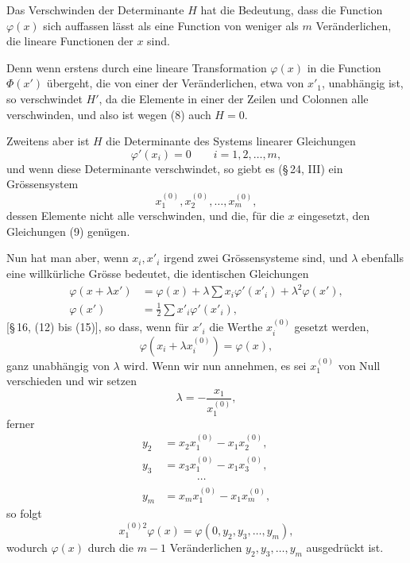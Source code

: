 \documentclass[11pt]{article}
\begin{document}
Das Verschwinden der Determinante $H$ hat die Bedeutung, dass die Function $\varphi(x)$ sich auffassen lässt als eine Function von weniger als $m$ Veränderlichen, die lineare Functionen der $x$ sind.

Denn wenn erstens durch eine lineare Transformation $\varphi(x)$ in die Function $\Phi(x')$ übergeht, die von einer der Veränderlichen, etwa von $x'_1$, unabhängig ist, so verschwindet $H'$, da die Elemente in einer der Zeilen und Colonnen alle verschwinden, und also ist wegen (8) auch $H=0$.

Zweitens aber ist $H$ die Determinante des Systems linearer Gleichungen
\begin{equation}
 \varphi'(x_i)=0\qquad i=1,2,\ldots,m,
\tag{9}
\end{equation}
und wenn diese Determinante verschwindet, so giebt es (\S\,24, III) ein Grössensystem
\begin{equation}
 x_1^{(0)},x_2^{(0)},\ldots,x_m^{(0)},
\tag{10}
\end{equation}
dessen Elemente nicht alle verschwinden, und die, für die $x$ eingesetzt, den Gleichungen (9) genügen.

Nun hat man aber, wenn $x_i,x'_i$ irgend zwei Grössensysteme sind, und $\lambda$ ebenfalls eine willkürliche Grösse bedeutet, die identischen Gleichungen
\begin{equation}
\begin{aligned}
 \varphi(x+\lambda x')&=\varphi(x)+\lambda\sum x_i\varphi'(x'_i)+\lambda^2\varphi(x'),\\
 \varphi(x')&=\frac12\sum x'_i\varphi'(x'_i),
\end{aligned}
\tag{11}
\end{equation}
[\S\,16, (12) bis (15)], so dass, wenn für $x'_i$ die Werthe $x_i^{(0)}$ gesetzt werden,
\begin{equation}
 \varphi(x_i+\lambda x_i^{(0)})=\varphi(x),
\tag{12}
\end{equation}
ganz unabhängig von $\lambda$ wird. Wenn wir nun annehmen, es sei $x_1^{(0)}$ von Null verschieden und wir setzen
\[
 \lambda=-\frac{x_1}{x_1^{(0)}},
\]
ferner
\begin{equation}
\begin{aligned}
 y_2&=x_2x_1^{(0)}-x_1x_2^{(0)},\\
 y_3&=x_3x_1^{(0)}-x_1x_3^{(0)},\\
 &\hspace{3em}\cdots\\
 y_m&=x_mx_1^{(0)}-x_1x_m^{(0)},
\end{aligned}
\tag{13}
\end{equation}
so folgt
\begin{equation}
 x_1^{(0)2}\varphi(x)=\varphi(0,y_2,y_3,\ldots,y_m),
\tag{14}
\end{equation}
wodurch $\varphi(x)$ durch die $m-1$ Veränderlichen $y_2,y_3,\ldots,y_m$ ausgedrückt ist.
\end{document}
